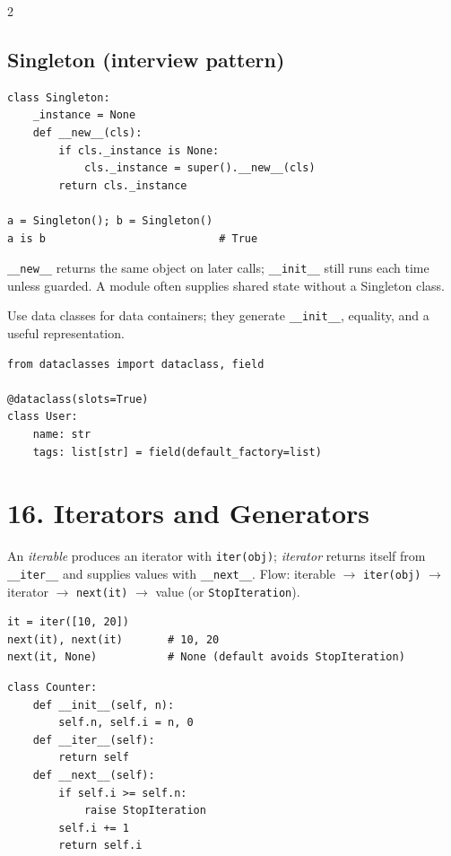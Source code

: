 \documentclass[10pt,a4paper]{article}
\newcommand{\py}[1]{\texttt{#1}}
\begin{document}
\begin{multicols}{2}
\subsection{Singleton (interview pattern)}

\begin{lstlisting}
class Singleton:
    _instance = None
    def __new__(cls):
        if cls._instance is None:
            cls._instance = super().__new__(cls)
        return cls._instance

a = Singleton(); b = Singleton()
a is b                           # True
\end{lstlisting}

\py{\_\_new\_\_} returns the same object on later calls; \py{\_\_init\_\_} still runs each time unless guarded. A module often supplies shared state without a Singleton class.

Use data classes for data containers; they generate \py{\_\_init\_\_}, equality, and a useful representation.

\begin{lstlisting}
from dataclasses import dataclass, field

@dataclass(slots=True)
class User:
    name: str
    tags: list[str] = field(default_factory=list)
\end{lstlisting}

\section{16. Iterators and Generators}

An \emph{iterable} produces an iterator with \py{iter(obj)}; \emph{iterator} returns itself from \py{\_\_iter\_\_} and supplies values with \py{\_\_next\_\_}. Flow: iterable $\rightarrow$ \py{iter(obj)} $\rightarrow$ iterator $\rightarrow$ \py{next(it)} $\rightarrow$ value (or \py{StopIteration}).

\begin{lstlisting}
it = iter([10, 20])
next(it), next(it)       # 10, 20
next(it, None)           # None (default avoids StopIteration)
\end{lstlisting}

\begin{lstlisting}
class Counter:
    def __init__(self, n):
        self.n, self.i = n, 0
    def __iter__(self):
        return self
    def __next__(self):
        if self.i >= self.n:
            raise StopIteration
        self.i += 1
        return self.i
\end{lstlisting}


\end{multicols}
\end{document}
